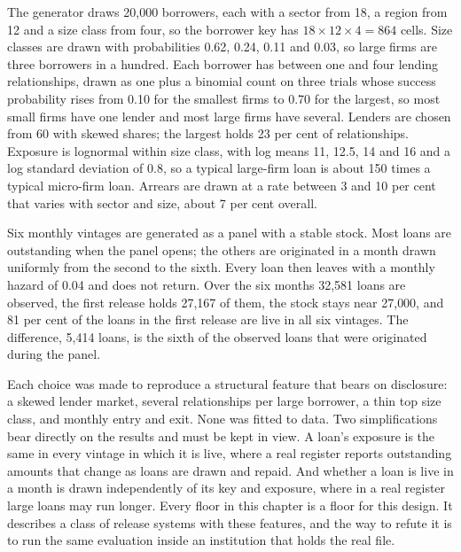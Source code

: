 The generator draws 20{,}000 borrowers, each with a sector from 18, a region from
12 and a size class from four, so the borrower key has $18 \times 12 \times 4 = 864$
cells. Size classes are drawn with probabilities 0.62, 0.24, 0.11 and 0.03, so large
firms are three borrowers in a hundred. Each borrower has between one and four
lending relationships, drawn as one plus a binomial count on three trials whose
success probability rises from 0.10 for the smallest firms to 0.70 for the largest,
so most small firms have one lender and most large firms have several. Lenders are
chosen from 60 with skewed shares; the largest holds 23 per cent of relationships.
Exposure is lognormal within size class, with log means 11, 12.5, 14 and 16 and a
log standard deviation of 0.8, so a typical large-firm loan is about 150 times a
typical micro-firm loan. Arrears are drawn at a rate between 3 and 10 per cent that
varies with sector and size, about 7 per cent overall.

Six monthly vintages are generated as a panel with a stable stock. Most loans are
outstanding when the panel opens; the others are originated in a month drawn
uniformly from the second to the sixth. Every loan then leaves with a monthly hazard
of 0.04 and does not return. Over the six months 32{,}581 loans are observed, the
first release holds 27{,}167 of them, the stock stays near 27{,}000, and 81 per cent
of the loans in the first release are live in all six vintages.
The difference, 5{,}414 loans, is the sixth of the observed loans that were
originated during the panel.

Each choice was made to reproduce a structural feature that bears on disclosure: a
skewed lender market, several relationships per large borrower, a thin top size
class, and monthly entry and exit. None was fitted to data. Two simplifications bear
directly on the results and must be kept in view. A loan's exposure is the same in
every vintage in which it is live, where a real register reports outstanding amounts
that change as loans are drawn and repaid. And whether a loan is live in a month is
drawn independently of its key and exposure, where in a real register large loans
may run longer. Every floor in this chapter is a floor for this design. It describes
a class of release systems with these features, and the way to refute it is to run
the same evaluation inside an institution that holds the real file.

